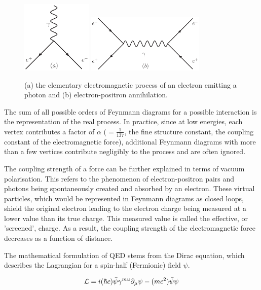 \begin{figure}[hbtp]
   \centering
     \includegraphics[width=0.3\textwidth]{Chapters/03_Theory/Images/e_e_gamma}\hfill
     \includegraphics[width=0.5\textwidth]{Chapters/03_Theory/Images/e_e_gamma_e_e}
     \caption{(a) the elementary electromagnetic process of an electron emitting a photon and (b)
     electron-positron annihilation.}
     \label{fig:qed_processes}
\end{figure}

The sum of all possible orders of Feynmann diagrams for a possible interaction is the representation of the
real process. In practice, since at low energies, each vertex contributes a factor of $\alpha$
($=\frac{1}{137}$, the fine structure constant, the coupling constant of the electromagnetic force),
additional Feynmann diagrams with more than a few vertices contribute negligibly to the process and are often
ignored.

The coupling strength of a force can be further explained in terms of vacuum polarisation. This refers to the
phenomenon of electron-positron pairs and photons being spontaneously created and absorbed by an electron.
These virtual particles, which would be represented in Feynmann diagrams as closed loops, shield the original
electron leading to the electron charge being measured at a lower value than its true charge. This measured
value is called the effective, or 'screened', charge. As a result, the coupling strength of the
electromagnetic force decreases as a function of distance.

The mathematical formulation of QED stems from the Dirac equation, which describes the Lagrangian for a
spin-half (Fermionic) field $\psi$.

\begin{equation}
\mathcal{L} = i (\hbar c) \bar{\psi} \gamma^{mu} \partial_{\mu} \psi - (mc^{2}) \bar{\psi} \psi
\end{equation}

